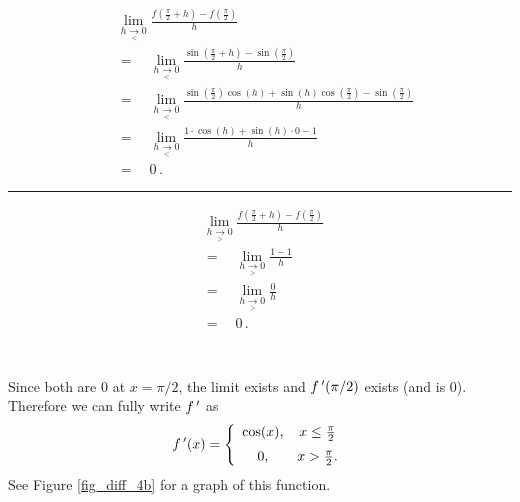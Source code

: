 \begin{example}
\noindent\begin{minipage}{.6\linewidth}
\begin{align*}
&\lim_{h\underset{<}{\rightarrow}0}\frac{f\left(\frac{\pi}{2}+h\right)-f\left(\frac{\pi}{2}\right)}{h} \\
&=\quad\lim_{h\underset{<}{\rightarrow}0}\frac{\sin\left(\frac{\pi}{2}+h\right)-\sin\left(\frac{\pi}{2}\right)}{h}\\
&=\quad\lim_{h\underset{<}{\rightarrow}0}{ \frac{\sin\left(\frac{\pi}{2}\right)\cos(h)+\sin(h)\cos\left(\frac{\pi}{2}\right)-\sin\left(\frac{\pi}{2}\right)}{h}}\\
&=\quad\lim_{h\underset{<}{\rightarrow}0}\frac{1\cdot\cos(h)+\sin(h)\cdot 0-1}{h} \\
&=\quad0\,.
\end{align*}
\end{minipage}
\begin{minipage}{1pt}
 \rule{.5pt}{100pt}
\end{minipage}
\begin{minipage}{.4\linewidth}
\begin{align*}
&\lim_{h\underset{>}{\rightarrow}0}\frac{f\left(\frac{\pi}{2}+h\right)-f\left(\frac{\pi}{2}\right)}{h}\\
&=\quad\lim_{h\underset{>}{\rightarrow}0}\frac{1-1}{h}\\
&=\quad\lim_{h\underset{>}{\rightarrow}0}\frac{0}{h}\\
&=\quad0\,.&\\
\phantom{0}\\
\phantom{0}
\end{align*}
\end{minipage}
\normalsize

Since both are 0 at $x=\pi/2$, the limit exists and $f\,'(\pi/2)$ exists (and is 0). Therefore we can fully write $f\,'$ as 
$$f\,'(x) = \left\{\begin{array}{cc} \cos(x), & x\leq\frac{\pi}{2}\\[0.2cm] 0, & x>\frac{\pi}{2}.\end{array}\right.$$ 
See Figure \ref{fig_diff_4b} for a graph of this function.
\end{example}


